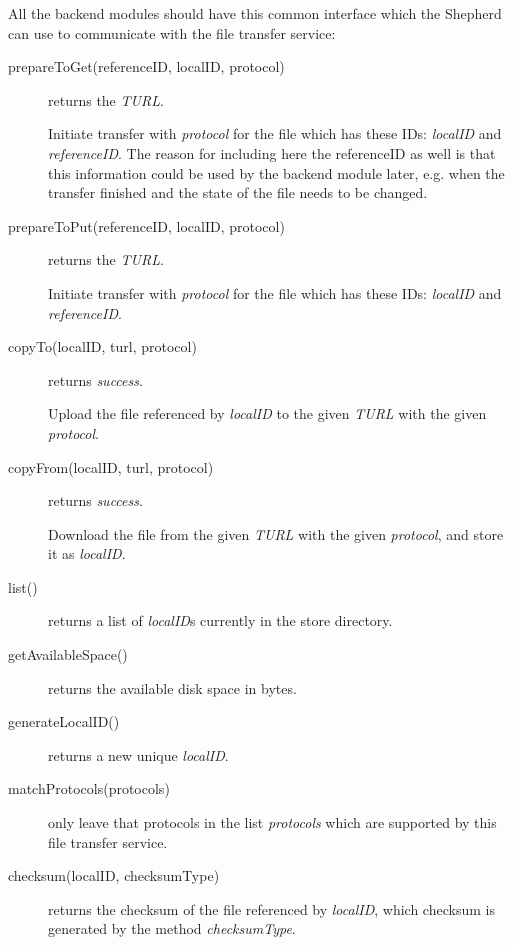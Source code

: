 \documentclass{book}
\begin{document}
All the backend modules should have this common interface which the Shepherd can use to communicate with the file transfer service:
\begin{description}
    \item[prepareToGet(referenceID, localID, protocol)] returns the \emph{TURL}.
    
    Initiate transfer with \emph{protocol} for the file which has these IDs: \emph{localID} and \emph{referenceID}. The reason for including here the referenceID as well is that this information could be used by the backend module later, e.g. when the transfer finished and the state of the file needs to be changed.
    
    \item[prepareToPut(referenceID, localID, protocol)] returns the \emph{TURL}.
    
    Initiate transfer with \emph{protocol} for the file which has these IDs: \emph{localID} and \emph{referenceID}.
    
    \item[copyTo(localID, turl, protocol)] returns \emph{success}.
    
    Upload the file referenced by \emph{localID} to the given \emph{TURL} with the given \emph{protocol}.
    
    \item[copyFrom(localID, turl, protocol)] returns \emph{success}.
    
    Download the file from the given \emph{TURL} with the given \emph{protocol}, and store it as \emph{localID}.
    
    \item[list()] returns a list of \emph{localID}s currently in the store directory.
    \item[getAvailableSpace()] returns the available disk space in bytes.
    \item[generateLocalID()] returns a new unique \emph{localID}.
    \item[matchProtocols(protocols)] only leave that protocols in the list \emph{protocols} which are supported by this file transfer service.
    \item[checksum(localID, checksumType)] returns the checksum of the file referenced by \emph{localID}, which checksum is generated by the method \emph{checksumType}.
     
\end{description}

\end{document}
